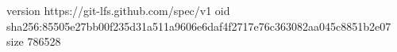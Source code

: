 version https://git-lfs.github.com/spec/v1
oid sha256:85505e27bb00f235d31a511a9606e6daf4f2717e76c363082aa045c8851b2e07
size 786528
